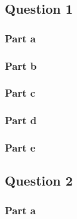 \subsection{Question 1}

\subsubsection{Part a}



\subsubsection{Part b}



\subsubsection{Part c}



\subsubsection{Part d}



\subsubsection{Part e}



\subsection{Question 2}

\subsubsection{Part a}


